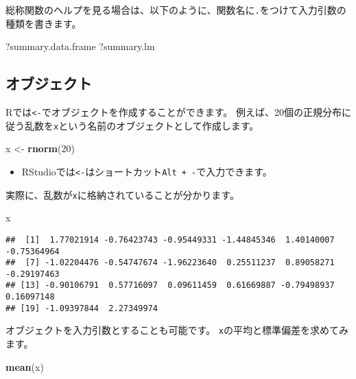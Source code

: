 \documentclass[]{bxjsarticle}
\newenvironment{Shaded}{\begin{snugshade}}{\end{snugshade}}
\newcommand{\DecValTok}[1]{\textcolor[rgb]{0.00,0.00,0.81}{#1}}
\newcommand{\KeywordTok}[1]{\textcolor[rgb]{0.13,0.29,0.53}{\textbf{#1}}}
\newcommand{\NormalTok}[1]{#1}
\newcommand{\StringTok}[1]{\textcolor[rgb]{0.31,0.60,0.02}{#1}}
\providecommand{\tightlist}{%
  \setlength{\itemsep}{0pt}\setlength{\parskip}{0pt}}
\begin{document}
総称関数のヘルプを見る場合は、以下のように、関数名に\texttt{.}をつけて入力引数の種類を書きます。

\begin{Shaded}
\begin{Highlighting}[]
\NormalTok{?summary.data.frame}
\NormalTok{?summary.lm}
\end{Highlighting}
\end{Shaded}

\hypertarget{ux30aaux30d6ux30b8ux30a7ux30afux30c8}{%
\subsection{オブジェクト}\label{ux30aaux30d6ux30b8ux30a7ux30afux30c8}}

Rでは\texttt{\textless{}-}でオブジェクトを作成することができます。
例えば、20個の正規分布に従う乱数を\texttt{x}という名前のオブジェクトとして作成します。

\begin{Shaded}
\begin{Highlighting}[]
\NormalTok{x <-}\StringTok{ }\KeywordTok{rnorm}\NormalTok{(}\DecValTok{20}\NormalTok{)}
\end{Highlighting}
\end{Shaded}

\begin{itemize}
\tightlist
\item
  RStudioでは\texttt{\textless{}-}はショートカット\texttt{Alt\ +\ -}で入力できます。
\end{itemize}

実際に、乱数が\texttt{x}に格納されていることが分かります。

\begin{Shaded}
\begin{Highlighting}[]
\NormalTok{x}
\end{Highlighting}
\end{Shaded}

\begin{verbatim}
##  [1]  1.77021914 -0.76423743 -0.95449331 -1.44845346  1.40140007 -0.75364964
##  [7] -1.02204476 -0.54747674 -1.96223640  0.25511237  0.89058271 -0.29197463
## [13] -0.90106791  0.57716097  0.09611459  0.61669887 -0.79498937  0.16097148
## [19] -1.09397844  2.27349974
\end{verbatim}

オブジェクトを入力引数とすることも可能です。
\texttt{x}の平均と標準偏差を求めてみます。

\begin{Shaded}
\begin{Highlighting}[]
\KeywordTok{mean}\NormalTok{(x)}
\end{Highlighting}
\end{Shaded}
\end{document}
